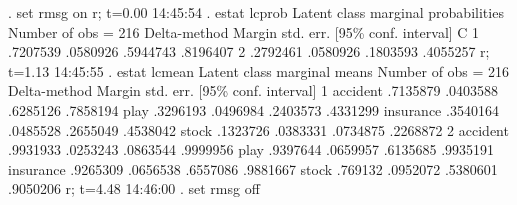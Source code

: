 . set rmsg on
r; t=0.00 14:45:54
{\smallskip}
. estat lcprob
{\smallskip}
Latent class marginal probabilities                        Number of obs = 216
{\smallskip}
             {\VBAR}            Delta-method
             {\VBAR}     Margin   std. err.     [95\% conf. interval]
           C {\VBAR}
          1  {\VBAR}   .7207539   .0580926      .5944743    .8196407
          2  {\VBAR}   .2792461   .0580926      .1803593    .4055257
r; t=1.13 14:45:55
{\smallskip}
. estat lcmean
{\smallskip}
Latent class marginal means                                Number of obs = 216
{\smallskip}
             {\VBAR}            Delta-method
             {\VBAR}     Margin   std. err.     [95\% conf. interval]
1            {\VBAR}
    accident {\VBAR}   .7135879   .0403588      .6285126    .7858194
        play {\VBAR}   .3296193   .0496984      .2403573    .4331299
   insurance {\VBAR}   .3540164   .0485528      .2655049    .4538042
       stock {\VBAR}   .1323726   .0383331      .0734875    .2268872
2            {\VBAR}
    accident {\VBAR}   .9931933   .0253243      .0863544    .9999956
        play {\VBAR}   .9397644   .0659957      .6135685    .9935191
   insurance {\VBAR}   .9265309   .0656538      .6557086    .9881667
       stock {\VBAR}    .769132   .0952072      .5380601    .9050206
r; t=4.48 14:46:00
{\smallskip}
. set rmsg off
{\smallskip}
